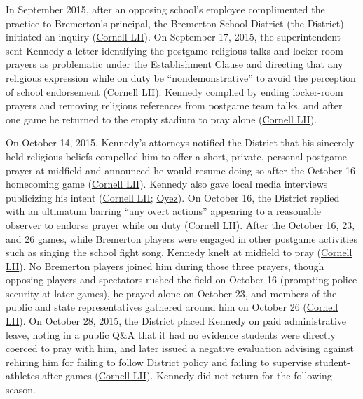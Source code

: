 \documentclass[12pt]{article}
\begin{document}
In September 2015, after an opposing school's employee complimented the practice to Bremerton's principal, the Bremerton School District (the District) initiated an inquiry (\href{https://www.law.cornell.edu/supremecourt/text/21-418}{Cornell LII}). On September 17, 2015, the superintendent sent Kennedy a letter identifying the postgame religious talks and locker-room prayers as problematic under the Establishment Clause and directing that any religious expression while on duty be ``nondemonstrative'' to avoid the perception of school endorsement (\href{https://www.law.cornell.edu/supremecourt/text/21-418}{Cornell LII}). Kennedy complied by ending locker-room prayers and removing religious references from postgame team talks, and after one game he returned to the empty stadium to pray alone (\href{https://www.law.cornell.edu/supremecourt/text/21-418}{Cornell LII}).

On October 14, 2015, Kennedy's attorneys notified the District that his sincerely held religious beliefs compelled him to offer a short, private, personal postgame prayer at midfield and announced he would resume doing so after the October 16 homecoming game (\href{https://www.law.cornell.edu/supremecourt/text/21-418}{Cornell LII}). Kennedy also gave local media interviews publicizing his intent (\href{https://www.law.cornell.edu/supremecourt/text/21-418}{Cornell LII}; \href{https://www.oyez.org/cases/2021/21-418}{Oyez}). On October 16, the District replied with an ultimatum barring ``any overt actions'' appearing to a reasonable observer to endorse prayer while on duty (\href{https://www.law.cornell.edu/supremecourt/text/21-418}{Cornell LII}). After the October 16, 23, and 26 games, while Bremerton players were engaged in other postgame activities such as singing the school fight song, Kennedy knelt at midfield to pray (\href{https://www.law.cornell.edu/supremecourt/text/21-418}{Cornell LII}). No Bremerton players joined him during those three prayers, though opposing players and spectators rushed the field on October 16 (prompting police security at later games), he prayed alone on October 23, and members of the public and state representatives gathered around him on October 26 (\href{https://www.law.cornell.edu/supremecourt/text/21-418}{Cornell LII}). On October 28, 2015, the District placed Kennedy on paid administrative leave, noting in a public Q\&A that it had no evidence students were directly coerced to pray with him, and later issued a negative evaluation advising against rehiring him for failing to follow District policy and failing to supervise student-athletes after games (\href{https://www.law.cornell.edu/supremecourt/text/21-418}{Cornell LII}). Kennedy did not return for the following season.
\end{document}
